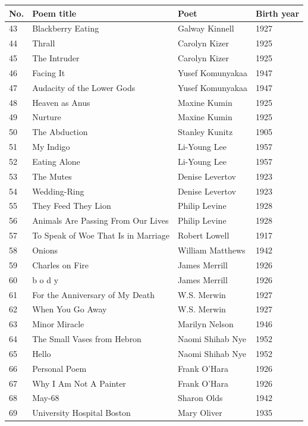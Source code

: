 \documentclass{book}
\begin{document}
\begin{table}[h!]
\tiny
\begin{tabular}{llll}

\toprule
No. & Poem title & Poet & Birth year \\
\midrule
43 & Blackberry Eating & Galway Kinnell & 1927 \\
44 & Thrall & Carolyn Kizer & 1925 \\
45 & The Intruder & Carolyn Kizer & 1925 \\
46 & Facing It & Yusef Komunyakaa & 1947 \\
47 & Audacity of the Lower Gods & Yusef Komunyakaa & 1947 \\
48 & Heaven as Anus & Maxine Kumin & 1925 \\
49 & Nurture & Maxine Kumin & 1925 \\
50 & The Abduction & Stanley Kunitz & 1905 \\
51 & My Indigo & Li-Young Lee & 1957 \\
52 & Eating Alone & Li-Young Lee & 1957 \\
53 & The Mutes & Denise Levertov & 1923 \\
54 & Wedding-Ring & Denise Levertov & 1923 \\
55 & They Feed They Lion & Philip Levine & 1928 \\
56 & Animals Are Passing From Our Lives & Philip Levine & 1928 \\
57 & To Speak of Woe That Is in Marriage & Robert Lowell & 1917 \\
58 & Onions & William Matthews & 1942 \\
59 & Charles on Fire & James Merrill & 1926 \\
60 & b o d y & James Merrill & 1926 \\
61 & For the Anniversary of My Death & W.S. Merwin & 1927 \\
62 & When You Go Away & W.S. Merwin & 1927 \\
63 & Minor Miracle & Marilyn Nelson & 1946 \\
64 & The Small Vases from Hebron & Naomi Shihab Nye & 1952 \\
65 & Hello & Naomi Shihab Nye & 1952 \\
66 & Personal Poem & Frank O'Hara & 1926 \\
67 & Why I Am Not A Painter & Frank O'Hara & 1926 \\
68 & May-68 & Sharon Olds & 1942 \\
69 & University Hospital Boston & Mary Oliver & 1935 \\

\end{tabular}
\end{table}
\end{document}

